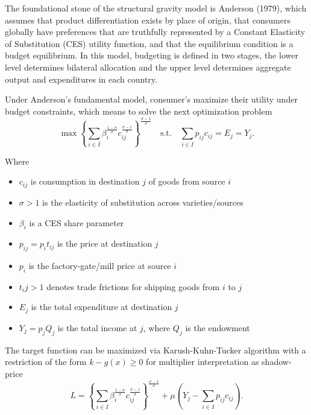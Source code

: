 \documentclass[12pt,reqno,oneside,pdftex]{formato-puc/puctesis} %
\providecommand{\tightlist}{%
  \setlength{\itemsep}{0pt}\setlength{\parskip}{0pt}}
\begin{document}
The foundational stone of the structural gravity model is Anderson
(1979), which assumes that product differentiation exists by place of
origin, that consumers globally have preferences that are truthfully
represented by a Constant Elasticity of Substitution (CES) utility
function, and that the equilibrium condition is a budget equilibrium. In
this model, budgeting is defined in two stages, the lower level
determines bilateral allocation and the upper level determines aggregate
output and expenditures in each country.

Under Anderson's fundamental model, consumer's maximize their utility
under budget constraints, which means to solve the next optimization
problem \begin{equation*}
\max \left\{ \sum_{i\in I} \beta_i^{\frac{1 - \sigma}{\sigma}} c_{ij}^{\frac{\sigma - 1}{\sigma}} \right\}^{\frac{\sigma - 1}{\sigma}} \quad \text{s.t.} \quad \sum_{i \in I} p_{ij} c_{ij} = E_j = Y_j.
\end{equation*}

Where

\begin{itemize}
\tightlist
\item
  \(c_{ij}\) is consumption in destination \(j\) of goods from source
  \(i\)
\item
  \(\sigma > 1\) is the elasticity of substitution across
  varieties/sources
\item
  \(\beta_i\) is a CES share parameter
\item
  \(p_{ij} = p_i t_{ij}\) is the price at destination \(j\)
\item
  \(p_i\) is the factory-gate/mill price at source \(i\)
\item
  \(t_ij > 1\) denotes trade frictions for shipping goods from \(i\) to
  \(j\)
\item
  \(E_j\) is the total expenditure at destination \(j\)
\item
  \(Y_j = p_j Q_j\) is the total income at \(j\), where \(Q_j\) is the
  endowment
\end{itemize}

The target function can be maximized via Karush-Kuhn-Tucker algorithm
with a restriction of the form \(k - g(x) \geq 0\) for multiplier
interpretation as shadow-price \begin{equation*}
L = \left\{ \sum_{i\in I} \beta_i^{\frac{1 - \sigma}{\sigma}} c_{ij}^{\frac{\sigma - 1}{\sigma}} \right\}^{\frac{\sigma - 1}{\sigma}} + \mu \left( Y_j - \sum_{i \in I} p_{ij} c_{ij} \right).
\end{equation*}
\end{document}

